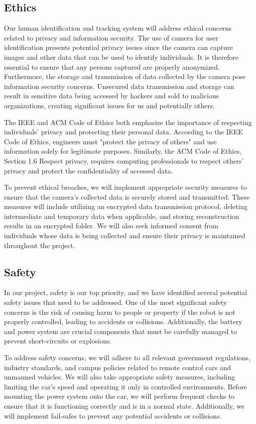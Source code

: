 \subsection{ Ethics }
Our human identification and tracking system will address ethical concerns related to privacy and information security. The use of camera for user identification presents potential privacy issues since the camera can capture images and other data that can be used to identify individuals. It is therefore essential to ensure that any persons captured are properly anonymized. Furthermore, the storage and transmission of data collected by the camera pose information security concerns. Unsecured data transmission and storage can result in sensitive data being accessed by hackers and sold to malicious organizations, creating significant issues for us and potentially others.

The IEEE and ACM Code of Ethics both emphasize the importance of respecting individuals' privacy and protecting their personal data. According to the IEEE Code of Ethics, engineers must "protect the privacy of others" \cite{IEEEethics} and use information solely for legitimate purposes. Similarly, the ACM Code of Ethics, Section 1.6 Respect privacy, requires computing professionals to respect others' privacy and protect the confidentiality of accessed data.

To prevent ethical breaches, we will implement appropriate security measures to ensure that the camera's collected data is securely stored and transmitted. These measures will include utilizing an encrypted data transmission protocol, deleting intermediate and temporary data when applicable, and storing reconstruction results in an encrypted folder. We will also seek informed consent from individuals whose data is being collected and ensure their privacy is maintained throughout the project.
\subsection{ Safety }
In our project, safety is our top priority, and we have identified several potential safety issues that need to be addressed. One of the most significant safety concerns is the risk of causing harm to people or property if the robot is not properly controlled, leading to accidents or collisions. Additionally, the battery and power system are crucial components that must be carefully managed to prevent short-circuits or explosions.

To address safety concerns, we will adhere to all relevant government regulations, industry standards, and campus policies related to remote control cars and unmanned vehicles. We will also take appropriate safety measures, including limiting the car's speed and operating it only in controlled environments. Before mounting the power system onto the car, we will perform frequent checks to ensure that it is functioning correctly and is in a normal state. Additionally, we will implement fail-safes to prevent any potential accidents or collisions.